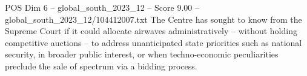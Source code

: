 \begin{textsample}{POS Dim 6 – global\_south\_2023\_12 – Score 9.00 – global\_south\_2023\_12/104412007.txt}
The Centre has sought to know from the Supreme Court if it could allocate airwaves administratively -- without holding competitive auctions -- to address unanticipated state priorities such as national security, in broader public interest, or when techno-economic peculiarities preclude the sale of spectrum via a bidding process.

\end{textsample}

